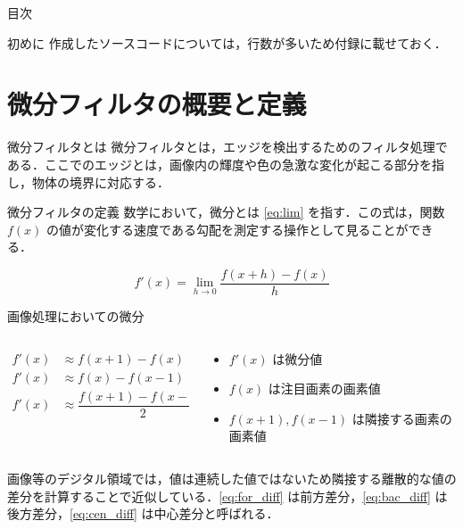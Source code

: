 \documentclass[10pt, jfont=ipaexm]{beamer} %
\begin{document}
\begin{frame}{目次}
    \tableofcontents
\end{frame}

\begin{frame}{初めに}
    作成したソースコードについては，行数が多いため付録に載せておく．
\end{frame}

\section{微分フィルタの概要と定義}
\begin{frame}{微分フィルタとは}
    微分フィルタとは，エッジを検出するためのフィルタ処理である．ここでのエッジとは，画像内の輝度や色の急激な変化が起こる部分を指し，物体の境界に対応する．
\end{frame}

\begin{frame}{微分フィルタの定義}
    数学において，微分とは \eqref{eq:lim} を指す．この式は，関数 $f(x)$ の値が変化する速度である勾配を測定する操作として見ることができる．
    \begin{block}{}
    \begin{equation} \label{eq:lim}
        f'(x) = \lim_{h \to 0} \dfrac{f(x+h) - f(x)}{h}
    \end{equation}
    \end{block}
\end{frame}

\begin{frame}{画像処理においての微分}
    \begin{block}{}
    \begin{columns}
    \begin{column}{0.48\textwidth}
        \vspace*{-\baselineskip}
        \begin{align}
            f'(x) & \approx f(x+1) - f(x) \label{eq:for_diff}\\
            f'(x) & \approx f(x) - f(x-1) \label{eq:bac_diff}\\
            f'(x) & \approx \dfrac{f(x+1) - f(x-1)}{2} \label{eq:cen_diff}
        \end{align}
    \end{column}
    \vrule \hspace {10pt}
    \begin{column}{0.48\textwidth}
        \begin{itemize}
            \item $f'(x)$ は微分値
            \item $f(x)$ は注目画素の画素値
            \item $f(x + 1), f(x - 1)$ は隣接する画素の画素値
        \end{itemize}
    \end{column}
    \end{columns}
    \end{block}
    画像等のデジタル領域では，値は連続した値ではないため隣接する離散的な値の差分を計算することで近似している．\eqref{eq:for_diff} は前方差分，\eqref{eq:bac_diff} は後方差分，\eqref{eq:cen_diff} は中心差分と呼ばれる．
\end{frame}
\end{document}
